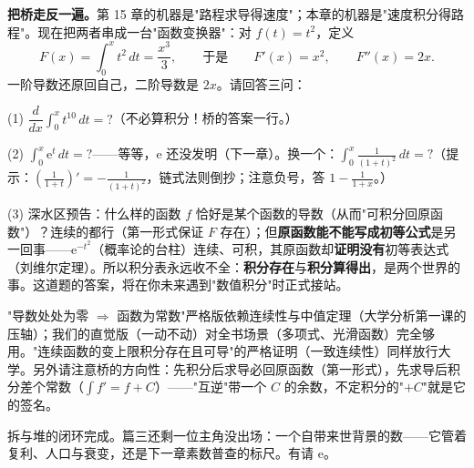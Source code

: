\begin{shaonao}
\textbf{把桥走反一遍。}第 15 章的机器是"路程求导得速度"；本章的机器是"速度积分得路程"。现在把两者串成一台"函数变换器"：对 $f(t) = t^2$，定义
\[
F(x) = \int_0^x t^2\,dt = \frac{x^3}{3}, \qquad\text{于是}\qquad F'(x) = x^2, \qquad F''(x) = 2x .
\]
一阶导数还原回自己，二阶导数是 $2x$。请回答三问：

(1) $\dfrac{d}{dx}\displaystyle\int_0^x t^{10}\,dt = ?$（不必算积分！桥的答案一行。）

(2) $\displaystyle\int_0^x \mathrm{e}^t\,dt = ?$——等等，$\mathrm{e}$ 还没发明（下一章）。换一个：$\displaystyle\int_0^x \frac{1}{(1+t)^2}\,dt = ?$（提示：$\left(\tfrac{1}{1+t}\right)' = -\tfrac{1}{(1+t)^2}$，链式法则倒抄；注意负号，答 $1 - \tfrac1{1+x}$。）

(3) 深水区预告：什么样的函数 $f$ 恰好是某个函数的导数（从而"可积分回原函数"）？连续的都行（第一形式保证 $F$ 存在）；但\textbf{原函数能不能写成初等公式}是另一回事——$\mathrm{e}^{-t^2}$（概率论的台柱）连续、可积，其原函数却\textbf{证明没有}初等表达式（刘维尔定理）。所以积分表永远收不全：\textbf{积分存在}与\textbf{积分算得出}，是两个世界的事。这道题的答案，将在你未来遇到"数值积分"时正式接站。
\end{shaonao}

\begin{chengshi}
"导数处处为零 $\Rightarrow$ 函数为常数"严格版依赖连续性与中值定理（大学分析第一课的压轴）；我们的直觉版（一动不动）对全书场景（多项式、光滑函数）完全够用。"连续函数的变上限积分存在且可导"的严格证明（一致连续性）同样放行大学。另外请注意桥的方向性：先积分后求导必回原函数（第一形式），先求导后积分差个常数（$\int f' = f + C$）——"互逆"带一个 $C$ 的余数，不定积分的"$+C$"就是它的签名。
\end{chengshi}

拆与堆的闭环完成。篇三还剩一位主角没出场：一个自带来世背景的数——它管着复利、人口与衰变，还是下一章素数普查的标尺。有请 $\mathrm{e}$。
